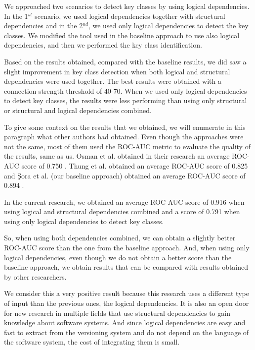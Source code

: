 \documentclass[runningheads]{comsis2}
\begin{document}
We approached two scenarios to detect key classes by using logical dependencies. In the 1$^{st}$ scenario, we used logical dependencies together with structural dependencies and in the 2$^{nd}$, we used only logical dependencies to detect the key classes. We modified the tool used in the baseline approach to use also logical dependencies, and then we performed the key class identification.

Based on the results obtained, compared with the baseline results, we did saw a slight improvement in key class detection when both logical and structural dependencies were used together. The best results were obtained with a connection strength threshold of 40-70. When we used only logical dependencies to detect key classes, the results were less performing than using only structural or structural and logical dependencies combined.

To give some context on the results that we obtained, we will enumerate in this paragraph what other authors had obtained. Even though the approaches were not the same, most of them used the ROC-AUC metric to evaluate the quality of the results, same as us.
Osman et al. obtained in their research an average ROC-AUC score of 0.750 \cite{6676885}. Thung et al. obtained an average ROC-AUC score of 0.825 \cite{rocclasification} and Şora et al. (our baseline approach) obtained an average ROC-AUC score of 0.894 \cite{Finding-key-classes}.

In the current research, we obtained an average ROC-AUC score of 0.916 when using logical and structural dependencies combined and a score of 0.791 when using only logical dependencies to detect key classes.

So, when using both dependencies combined, we can obtain a slightly better ROC-AUC score than the one from the baseline approach. And, when using only logical dependencies, even though we do not obtain a better score than the baseline approach, we obtain results that can be compared with results obtained by other researchers. 

We consider this a very positive result because this research uses a different type of input than the previous ones, the logical dependencies. It is also an open door for new research in multiple fields that use structural dependencies to gain knowledge about software systems. And since logical dependencies are easy and fast to extract from the versioning system and do not depend on the language of the software system, the cost of integrating them is small. 
\end{document}
